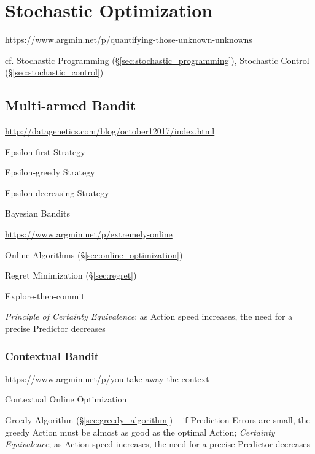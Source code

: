 \section{Stochastic Optimization}\label{sec:stochastic_optimization}


\url{https://www.argmin.net/p/quantifying-those-unknown-unknowns}

cf. Stochastic Programming (\S\ref{sec:stochastic_programming}),
Stochastic Control (\S\ref{sec:stochastic_control})



\subsection{Multi-armed Bandit}\label{sec:multiarmed_bandit}

\url{http://datagenetics.com/blog/october12017/index.html}

Epsilon-first Strategy

Epsilon-greedy Strategy

Epsilon-decreasing Strategy

Bayesian Bandits

\url{https://www.argmin.net/p/extremely-online}

Online Algorithms (\S\ref{sec:online_optimization})

Regret Minimization (\S\ref{sec:regret})

Explore-then-commit

\emph{Principle of Certainty Equivalence}; as Action speed increases, the need
for a precise Predictor decreases



\subsubsection{Contextual Bandit}\label{sec:contextual_bandit}

\url{https://www.argmin.net/p/you-take-away-the-context}

Contextual Online Optimization

Greedy Algorithm (\S\ref{sec:greedy_algorithm}) -- if Prediction Errors are
small, the greedy Action must be almost as good as the optimal Action;
\emph{Certainty Equivalence}; as Action speed increases, the need for a precise
Predictor decreases



